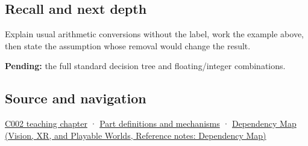 \subsection{Recall and next depth}\label{appendix-5e2d663adf7f-recall-and-next-depth}

Explain usual arithmetic conversions without the label, work the example above, then state the assumption whose removal would change the result.

\textbf{Pending:} the full standard decision tree and floating/integer combinations.

\subsection{Source and navigation}\label{appendix-5e2d663adf7f-source-and-navigation}

\hyperref[01-foundations-i-ch001-arithmetic-becomes-a-policy]{C002 teaching chapter} · \hyperref[appendix-fd090d982a15]{Part definitions and mechanisms} · \href{../07-Vision-XR-and-Playable-Worlds/main.pdf\#nameddest=appendix-4ad47bdd269a}{Dependency Map (Vision, XR, and Playable Worlds, Reference notes: Dependency Map)}
